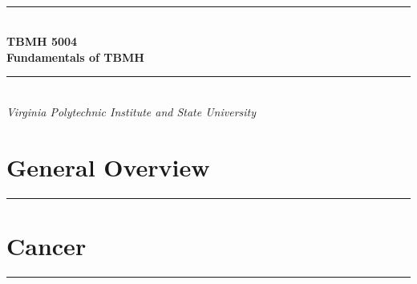 \documentclass[11pt, final]{article}
\begin{document}
	
	\newcommand{\HRule}{\rule{\linewidth}{0.5mm}}


	\begin{titlepage}
		{~ \\[5cm] }
		
		\noindent \HRule \\[0.4cm]
		{ \Huge \bfseries TBMH 5004 \\[0.4cm] }
		{ \huge \bfseries Fundamentals of TBMH \\ }
		\HRule \\[0.4cm]
		
		{ \large \emph{Virginia Polytechnic Institute and State University} }
	\end{titlepage}


	\tableofcontents
	\clearpage
	

	
	\part{General Overview}
	\HRule
	
	
	
	
	
%	
%	
%	
%	
	
	
	\clearpage
	\part{Cancer}
	\HRule
%	
%	
%	
%	
	
%	
%	
%	
%	
	
	
	\clearpage
\end{document}
